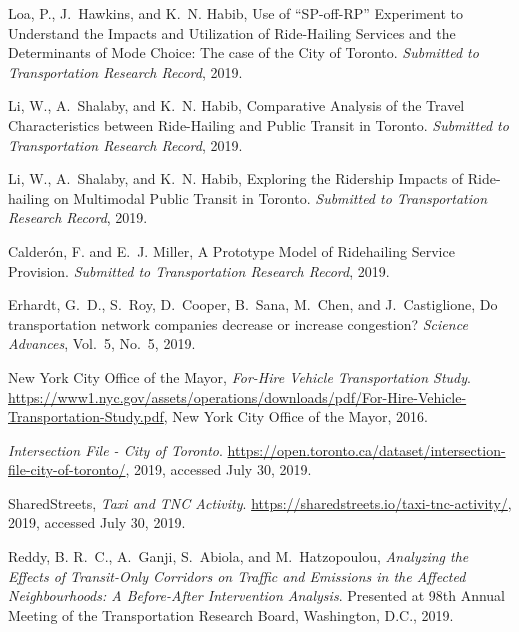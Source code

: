 \documentclass[]{trbunofficial_bdit_final}
\begin{document}
\begin{thebibliography}{33}
Loa, P., J.~Hawkins, and K.~N. Habib, Use of ``SP-off-RP'' Experiment to
  Understand the Impacts and Utilization of Ride-Hailing Services and the
  Determinants of Mode Choice: The case of the City of Toronto. \emph{Submitted
  to Transportation Research Record}, 2019.

Li, W., A.~Shalaby, and K.~N. Habib, Comparative Analysis of the Travel
  Characteristics between Ride-Hailing and Public Transit in Toronto.
  \emph{Submitted to Transportation Research Record}, 2019{}.

Li, W., A.~Shalaby, and K.~N. Habib, Exploring the Ridership Impacts of
  Ride-hailing on Multimodal Public Transit in Toronto. \emph{Submitted to
  Transportation Research Record}, 2019{}.

Calder\'{o}n, F. and E.~J. Miller, A Prototype Model of Ridehailing Service
  Provision. \emph{Submitted to Transportation Research Record}, 2019.

Erhardt, G.~D., S.~Roy, D.~Cooper, B.~Sana, M.~Chen, and J.~Castiglione, Do
  transportation network companies decrease or increase congestion?
  \emph{Science Advances}, Vol.~5, No.~5, 2019.

{New York City Office of the Mayor}, \emph{For-Hire Vehicle Transportation
  Study}.
  \url{https://www1.nyc.gov/assets/operations/downloads/pdf/For-Hire-Vehicle-Transportation-Study.pdf},
  New York City Office of the Mayor, 2016.

\emph{Intersection File - City of Toronto}.
  \url{https://open.toronto.ca/dataset/intersection-file-city-of-toronto/},
  2019, accessed July 30, 2019.

{SharedStreets}, \emph{Taxi and TNC Activity}.
  \url{https://sharedstreets.io/taxi-tnc-activity/}, 2019, accessed July 30,
  2019.

Reddy, B. R.~C., A.~Ganji, S.~Abiola, and M.~Hatzopoulou, \emph{Analyzing the
  Effects of Transit-Only Corridors on Traffic and Emissions in the Affected
  Neighbourhoods: A Before-After Intervention Analysis}. Presented at 98th
  Annual Meeting of the Transportation Research Board, Washington, D.C., 2019.


\end{thebibliography}
\end{document}
